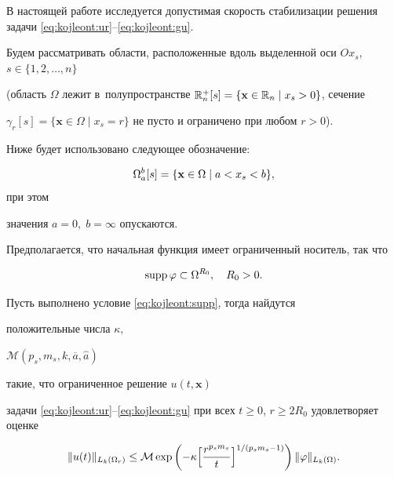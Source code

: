 В настоящей работе исследуется допустимая скорость стабилизации решения задачи \eqref{eq:kojleont:ur}--\eqref{eq:kojleont:gu}.

Будем рассматривать области, расположенные вдоль выделенной оси $Ox_s$, $s\in\{1, 2, \dots, n\}$ 

(область $\Omega$ лежит  в~полупространстве $\mathbb{R}^+_n[s]=\{{\bf x}\in \mathbb{R}_n \mid x_s>0\}$, сечение

$\gamma_r[s]=\{\textbf{x}\in\Omega \mid x_s=r\}$ не пусто и ограничено при любом $r>0$). 

Ниже будет использовано следующее обозначение:

$$\Omega_{a}^{b}[s]=\{{\bf x}\in\Omega\;|\;a<x_s<b\},$$ при этом

значения $a=0,\;b=\infty$ опускаются.



Предполагается, что начальная функция имеет ограниченный носитель, так что

\begin{equation}

\label{eq:kojleont:supp}

\mathop{\rm supp} \varphi\subset\Omega^{R_0},\quad R_0>0.

\end{equation}



\smallskip



\begin{theorem}[1]\label{eq:kojleont:the_1(00)}

Пусть выполнено условие  \eqref{eq:kojleont:supp}, тогда найдутся

положительные числа $\kappa,$

$\mathcal{M}(p_s,m_s,k,\overline{a},\widehat{a})$

 такие, что ограниченное решение $u(t,\mathbf{x})$

 задачи \eqref{eq:kojleont:ur}--\eqref{eq:kojleont:gu} при всех $t\geq

0$, $r\geq 2R_0$ удовлетворяет оценке

\begin{equation}\label{eq:kojleont:teorem_1(0)}

\|u(t)\|_{L_k(\Omega_{r})}\leq \mathcal{M}

\exp\left(-\kappa\Bigl[\frac{r^{p_sm_s}}{

t}\Bigr]^{1/(p_sm_s-1)}\right)\|\varphi\|_{L_k(\Omega)}.

\end{equation}

\end{theorem}



